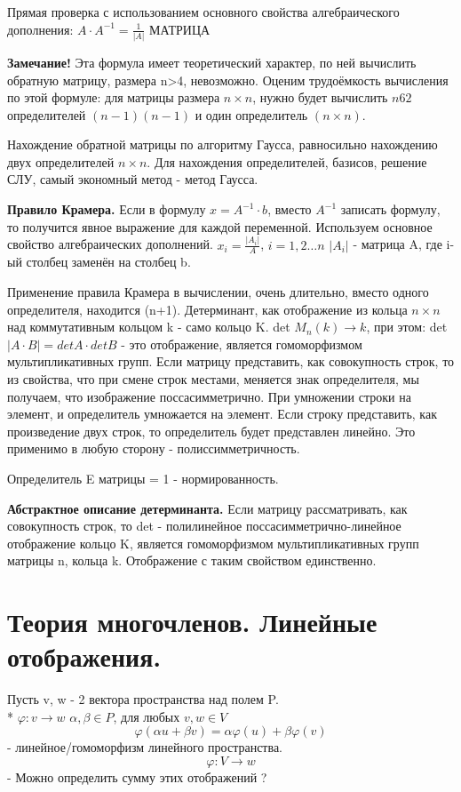 \documentclass{article}
\begin{document}
Прямая проверка с использованием основного свойства алгебраического дополнения: $A\cdot A^{-1}=\frac{1}{|A|}$ МАТРИЦА

{\bf Замечание!} Эта формула имеет теоретический характер, по ней вычислить обратную матрицу, размера n>4, невозможно. Оценим трудоёмкость вычисления по этой формуле: для матрицы размера $n\times n$, нужно будет вычислить $n62$ определителей $(n-1)(n-1)$ и один определитель $(n\times n)$.

Нахождение обратной матрицы по алгоритму Гаусса, равносильно нахождению двух определителей $n\times n$. Для нахождения определителей, базисов, решение СЛУ, самый экономный метод - метод Гаусса.

{\bf Правило Крамера.} Если в формулу $x=A^{-1}\cdot b$, вместо $A^{-1}$ записать формулу, то получится явное выражение для каждой переменной. Используем основное свойство алгебраических дополнений. $x_i=\frac{|A_i|}{A}$, $i=1,2\ldots n$
$|A_i|$ - матрица A, где i-ый столбец заменён на столбец b.

Применение правила Крамера в вычислении, очень длительно, вместо одного определителя, находится (n+1). Детерминант, как отображение из кольца $n\times n$ над коммутативным кольцом k - само кольцо K. det $M_n(k)\to k$, при этом: det $|A\cdot B|=det A\cdot det B$ - это отображение, является гомоморфизмом мультипликативных групп. Если матрицу представить, как совокупность строк, то из свойства, что при смене строк местами, меняется знак определителя, мы получаем, что изображение поссасимметрично. При умножении строки на элемент, и определитель умножается на элемент. Если строку представить, как произведение двух строк, то определитель будет представлен линейно. Это применимо в любую сторону - полиссимметричность.

Определитель E матрицы = 1 - нормированность.

{\bf Абстрактное описание детерминанта.} Если матрицу рассматривать, как совокупность строк, то det - полилинейное поссасимметрично-линейное отображение кольцо K, является гомоморфизмом мультипликативных групп матрицы n, кольца k. Отображение с таким свойством единственно.
\section*{Теория многочленов. Линейные отображения.}

Пусть v, w - 2 вектора пространства над полем P.\\*
$\varphi: v\to w$ $\alpha, \beta \in P $, для любых $v, w \in V$
$$\varphi(\alpha u + \beta v)=\alpha\varphi(u)+\beta\varphi(v)$$ - линейное/гомоморфизм линейного пространства. $$\varphi:V\to w$$ - Можно определить сумму этих отображений ?
\end{document}
